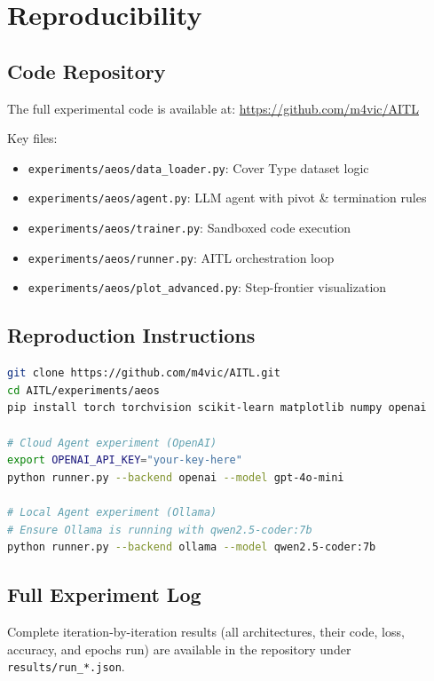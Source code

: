 \documentclass[11pt]{article}
\begin{document}
\section{Reproducibility}
\label{sec:appendix}

\subsection{Code Repository}

The full experimental code is available at: \url{https://github.com/m4vic/AITL}

Key files:
\begin{itemize}[nosep]
  \item \texttt{experiments/aeos/data\_loader.py}: Cover Type dataset logic
  \item \texttt{experiments/aeos/agent.py}: LLM agent with pivot \& termination rules
  \item \texttt{experiments/aeos/trainer.py}: Sandboxed code execution
  \item \texttt{experiments/aeos/runner.py}: AITL orchestration loop
  \item \texttt{experiments/aeos/plot\_advanced.py}: Step-frontier visualization
\end{itemize}

\subsection{Reproduction Instructions}

\begin{lstlisting}[language=bash]
git clone https://github.com/m4vic/AITL.git
cd AITL/experiments/aeos
pip install torch torchvision scikit-learn matplotlib numpy openai

# Cloud Agent experiment (OpenAI)
export OPENAI_API_KEY="your-key-here"
python runner.py --backend openai --model gpt-4o-mini

# Local Agent experiment (Ollama)
# Ensure Ollama is running with qwen2.5-coder:7b
python runner.py --backend ollama --model qwen2.5-coder:7b
\end{lstlisting}

\subsection{Full Experiment Log}

Complete iteration-by-iteration results (all architectures, their code, loss, accuracy, and epochs run) are available in the repository under \texttt{results/run\_*.json}.
\end{document}
